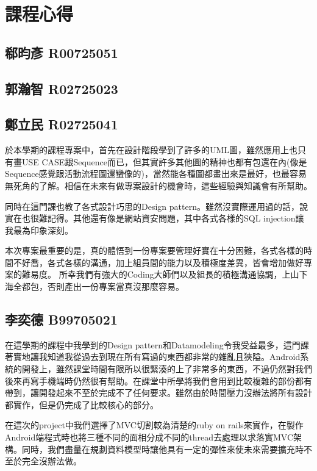 \section{課程心得}
\subsection{郗昀彥 R00725051}

\subsection{郭瀚智 R02725023}

\subsection{鄭立民 R02725041}

於本學期的課程專案中，首先在設計階段學到了許多的UML圖，雖然應用上也只有畫USE CASE跟Sequence而已，但其實許多其他圖的精神也都有包還在內(像是Sequence感覺跟活動流程圖還蠻像的)，當然能各種圖都畫出來是最好，也最容易無死角的了解。相信在未來有做專案設計的機會時，這些經驗與知識會有所幫助。

同時在這門課也教了各式設計巧思的Design pattern。雖然沒實際運用過的話，說實在也很難記得。其他還有像是網站資安問題，其中各式各樣的SQL injection讓我最為印象深刻。

本次專案最重要的是，真的體悟到一份專案要管理好實在十分困難，各式各樣的時間不好喬，各式各樣的溝通，加上組員間的能力以及積極度差異，皆會增加做好專案的難易度。
所幸我們有強大的Coding大師們以及組長的積極溝通協調，上山下海全都包，否則產出一份專案當真沒那麼容易。

\subsection{李奕德 B99705021}

在這學期的課程中我學到的Design pattern和Datamodeling令我受益最多，這門課著實地讓我知道我從過去到現在所有寫過的東西都非常的雜亂且狹隘。Android系統的開發上，雖然課堂時間有限所以很緊湊的上了非常多的東西，不過仍然對我們後來再寫手機端時仍然很有幫助。在課堂中所學將我們會用到比較複雜的部份都有帶到，讓開發起來不至於完成不了任何要求。雖然由於時間壓力沒辦法將所有設計都實作，但是仍完成了比較核心的部分。

在這次的project中我們選擇了MVC切割較為清楚的ruby on rails來實作，在製作Android端程式時也將三種不同的面相分成不同的thread去處理以求落實MVC架構。同時，我們盡量在規劃資料模型時讓他具有一定的彈性來使未來需要擴充時不至於完全沒辦法做。

